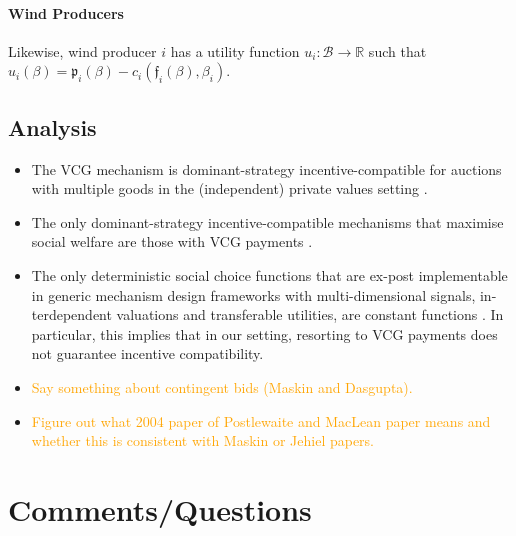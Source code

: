 \documentclass{article}
\begin{document}
\paragraph{Wind Producers} Likewise, wind producer $i$ has a utility function $u_i: \mathcal{B} \rightarrow \mathbb{R}$ such that $u_i(\beta) = \mathfrak{p}_i(\beta) - c_i(\mathfrak{f}_i(\beta), \beta_i)$.


\subsection{Analysis}

\begin{itemize}
\item The VCG mechanism is dominant-strategy incentive-compatible for auctions with multiple goods in the (independent) private values setting \cite{Vickrey1961,Clarke1971,Groves1973}.
\item The only dominant-strategy incentive-compatible mechanisms that maximise social welfare are those with VCG payments \cite{GreenLaffont1977}.
\item The only deterministic social choice functions that are ex-post implementable
in generic mechanism design frameworks with multi-dimensional signals, in-
terdependent valuations and transferable utilities, are constant functions \cite{Jehiel2006}. In particular, this implies that in our setting, resorting to VCG payments does not guarantee incentive compatibility.
\item \textcolor{orange}{Say something about contingent bids (Maskin and Dasgupta).}
\item \textcolor{orange}{Figure out what 2004 paper of Postlewaite and MacLean paper means and whether this is consistent with Maskin or Jehiel papers.}
\end{itemize}


\section{Comments/Questions}
\end{document}
